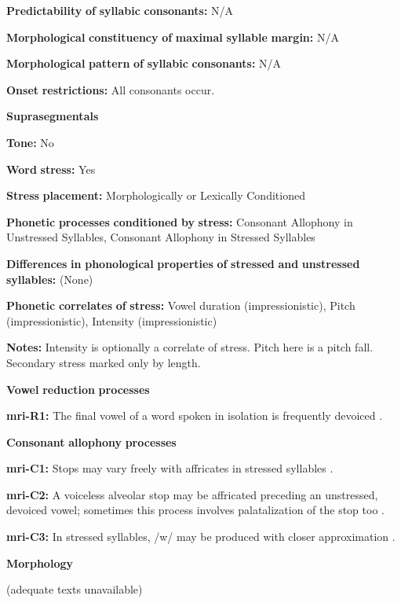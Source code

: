 \begin{styleBody}
\textbf{Predictability} \textbf{of} \textbf{syllabic} \textbf{consonants:} N/A

\textbf{Morphological} \textbf{constituency} \textbf{of} \textbf{maximal} \textbf{syllable} \textbf{margin:} N/A

\textbf{Morphological} \textbf{pattern} \textbf{of} \textbf{syllabic} \textbf{consonants:} N/A

\textbf{Onset} \textbf{restrictions:} All consonants occur.

\textbf{Suprasegmentals}

\textbf{Tone:} No

\textbf{Word} \textbf{stress:} Yes

\textbf{Stress} \textbf{placement:} Morphologically or Lexically Conditioned

\textbf{Phonetic} \textbf{processes} \textbf{conditioned} \textbf{by} \textbf{stress:} Consonant Allophony in Unstressed Syllables, Consonant Allophony in Stressed Syllables

\textbf{Differences} \textbf{in} \textbf{phonological} \textbf{properties} \textbf{of} \textbf{stressed} \textbf{and} \textbf{unstressed} \textbf{syllables:} (None)

\textbf{Phonetic} \textbf{correlates} \textbf{of} \textbf{stress:} Vowel duration (impressionistic), Pitch (impressionistic), Intensity (impressionistic)

\textbf{Notes:} Intensity is optionally a correlate of stress. Pitch here is a pitch fall. Secondary stress marked only by length.

\textbf{Vowel} \textbf{reduction} \textbf{processes}

\textbf{mri-R1:} The final vowel of a word spoken in isolation is frequently devoiced \citep[546]{Bauer1999}.

\textbf{Consonant} \textbf{allophony} \textbf{processes}

\textbf{mri-C1:} Stops may vary freely with affricates in stressed syllables \citep[545]{Bauer1999}.

\textbf{mri-C2:} A voiceless alveolar stop may be affricated preceding an unstressed, devoiced vowel; sometimes this process involves palatalization of the stop too \citep{Bauer1999}.

\textbf{mri-C3:} In stressed syllables, /w/ may be produced with closer approximation \citep[545]{Bauer1999}.

\textbf{Morphology}

(adequate texts unavailable)


\end{styleBody}
